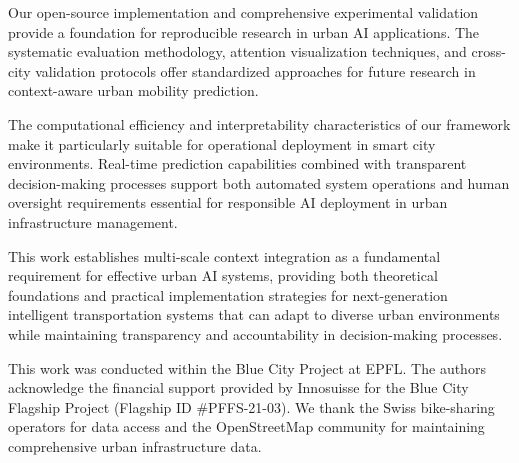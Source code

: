 \documentclass[sigconf,review,nonacm]{acmart}
\begin{document}
Our open-source implementation and comprehensive experimental validation provide a foundation for reproducible research in urban AI applications. The systematic evaluation methodology, attention visualization techniques, and cross-city validation protocols offer standardized approaches for future research in context-aware urban mobility prediction.

The computational efficiency and interpretability characteristics of our framework make it particularly suitable for operational deployment in smart city environments. Real-time prediction capabilities combined with transparent decision-making processes support both automated system operations and human oversight requirements essential for responsible AI deployment in urban infrastructure management.

This work establishes multi-scale context integration as a fundamental requirement for effective urban AI systems, providing both theoretical foundations and practical implementation strategies for next-generation intelligent transportation systems that can adapt to diverse urban environments while maintaining transparency and accountability in decision-making processes.

\begin{acks}
This work was conducted within the Blue City Project at EPFL. The authors acknowledge the financial support provided by Innosuisse for the Blue City Flagship Project (Flagship ID \#PFFS-21-03). We thank the Swiss bike-sharing operators for data access and the OpenStreetMap community for maintaining comprehensive urban infrastructure data.
\end{acks}



\end{document}
